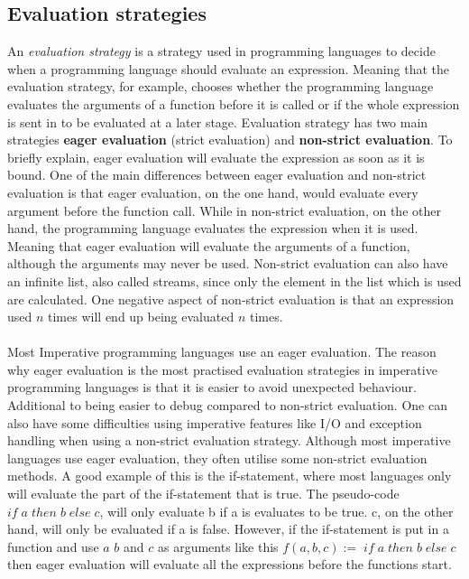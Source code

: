 \subsection{Evaluation strategies}
An \textit{evaluation strategy} is a strategy used in programming languages to decide when a programming language should evaluate an expression. 
Meaning that the evaluation strategy, for example, chooses whether the programming language evaluates the arguments of a function before it is called or 
if the whole expression is sent in to be evaluated at a later stage. Evaluation strategy has two main strategies \textbf{eager evaluation} (strict evaluation) 
and \textbf{non-strict evaluation}. To briefly explain, eager evaluation will evaluate the expression as soon as it is bound. 
One of the main differences between eager evaluation and non-strict evaluation is that eager evaluation, on the one hand, 
would evaluate every argument before the function call. While in non-strict evaluation, on the other hand, 
the programming language evaluates the expression when it is used. 
Meaning that eager evaluation will evaluate the arguments of a function, although the arguments may never be used. 
Non-strict evaluation can also have an infinite list, also called streams, since only the element in the list which is used are calculated. 
One negative aspect of non-strict evaluation is that an expression used $n$ times will end up being evaluated $n$ times. 
\\ \\
Most Imperative programming languages use an eager evaluation. The reason why eager evaluation is the most practised evaluation strategies in 
imperative programming languages is that it is easier to avoid unexpected behaviour. Additional to being easier to debug compared to non-strict evaluation. 
One can also have some difficulties using imperative features like I/O and exception handling when using a non-strict evaluation strategy. 
Although most imperative languages use eager evaluation, they often utilise some non-strict evaluation methods. A good example of this is the if-statement, 
where most languages only will evaluate the part of the if-statement that is true. The pseudo-code $if\; a\; then\; b\; else\; c$, will only evaluate b if a is evaluates to be true. 
c, on the other hand, will only be evaluated if a is false. However, if the if-statement is put in a function and use $a$ $b$ and $c$ as arguments 
like this $f(a, b,c):= \; if\; a\; then\; b\; else\; c$ then eager evaluation will evaluate all the expressions before the functions start. 
